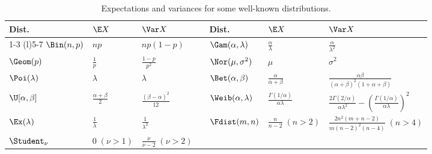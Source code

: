 \begin{table}[H]
	\centering
	\caption{Expectations and variances for some well-known distributions.}
	\label{tab:ExpectationsVariances}
	\renewcommand{\arraystretch}{2.2}
	\begin{tabular}{@{}lll c lll@{}}
		\toprule
		Dist.               & $\E X$                     & $\Var X$                         & \hspace{1cm} & Dist.                    & $\E X$                                    & $\Var X$                                                                                             \\
		\cmidrule(r){1-3} \cmidrule(l){5-7}
		$\Bin(n, p)$        & $np$                       & $np(1 - p)$                      &              & $\Gam(\alpha, \lambda)$  & $\frac{\alpha}{\lambda}$                  & $\frac{\alpha}{\lambda^2}$                                                                           \\
		$\Geom(p)$          & $\frac{1}{p}$              & $\frac{1 - p}{p^2}$              &              & $\Nor(\mu, \sigma^2)$    & $\mu$                                     & $\sigma^2$                                                                                           \\
		$\Poi(\lambda)$     & $\lambda$                  & $\lambda$                        &              & $\Bet(\alpha, \beta)$    & $\frac{\alpha}{\alpha+\beta}$             & $\frac{\alpha\beta}{(\alpha+\beta)^2(1+\alpha+\beta)}$                                               \\
		$\U[\alpha, \beta]$ & $\frac{\alpha + \beta}{2}$ & $\frac{(\beta - \alpha)^2}{12}$  &              & $\Weib(\alpha, \lambda)$ & $\frac{\Gamma(1/\alpha)}{\alpha \lambda}$ & $\frac{2\Gamma(2/\alpha)}{\alpha\lambda^2} - \left(\frac{\Gamma(1/\alpha)}{\alpha \lambda}\right)^2$ \\
		$\Ex(\lambda)$      & $\frac{1}{\lambda}$        & $\frac{1}{\lambda^2}$            &              & $\Fdist(m, n)$           & $\frac{n}{n-2} \; (n > 2)$                & $\frac{2n^2(m+n-2)}{m(n-2)^2(n-4)} \; (n > 4)$                                                       \\
		$\Student_\nu$      & $0 \; (\nu > 1)$           & $\frac{\nu}{\nu-2} \; (\nu > 2)$ &              &                          &                                           &                                                                                                      \\
		\bottomrule
	\end{tabular}
\end{table}

